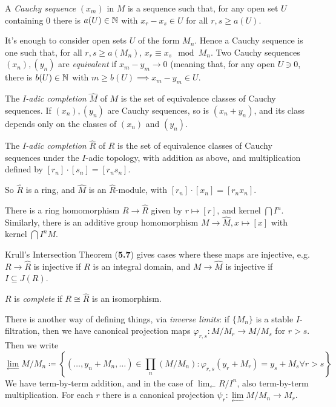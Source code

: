 \documentclass[10pt,a4paper]{article}
\begin{document}
\begin{definition}
  A \emph{Cauchy sequence} $(x_m)$ in $M$ is a sequence such that, for any open set $U$ containing $0$ there is $a(U) \in \mathbb{N}$ with $x_r - x_s \in U$ for all $r, s \geq a(U)$.
\end{definition}
It's enough to consider open sets $U$ of the form $M_n$. Hence a Cauchy sequence is one such that, for all $r, s \geq a(M_n)$, $x_r \equiv x_s \mod M_n$. Two Cauchy sequences $(x_n), (y_n)$ are \emph{equivalent} if $x_m-y_m \to 0$ (meaning that, for any open $U \ni 0$, there is $b(U) \in \mathbb{N}$ with $m \geq b(U) \implies x_m-y_m \in U$.
\begin{definition}
  The \emph{I-adic completion} $\hat{M}$ of $M$ is the set of equivalence classes of Cauchy sequences. If $(x_n), (y_n)$ are Cauchy sequences, so is $(x_n + y_n)$, and its class depends only on the classes of $(x_n)$ and $(y_n)$.

  The \emph{I-adic completion} $\hat{R}$ of $R$ is the set of equivalence classes of Cauchy sequences under the $I$-adic topology, with addition as above, and multiplication defined by $[r_n]\cdot [s_n]
   = [r_ns_n]$.
\end{definition}
So $\hat{R}$ is a ring, and $\hat{M}$ is an $\hat{R}$-module, with $[r_n]\cdot [x_n] = [r_nx_n]$.

There is a ring homomorphism $R \to \hat{R}$ given by $r \mapsto [r]$, and kernel $\bigcap I^n$. Similarly, there is an additive group homomorphism $M \to \hat{M}, x \mapsto [x]$ with kernel $\bigcap I^n M$.

Krull's Intersection Theorem (\textbf{5.7}) gives cases where these maps are injective, e.g. $R \to \hat{R}$ is injective if $R$ is an integral domain, and $M \to \hat{M}$ is injective if $I \subseteq J(R)$.
\begin{definition}
  $R$ is \emph{complete} if $R \cong \hat{R}$ is an isomorphism.
\end{definition}
There is another way of defining things, via \emph{inverse limits}: if $\{M_n\}$ is a stable $I$-filtration, then we have canonical projection maps $\varphi_{r,s}: M/M_r \to M/M_s$ for $r>s$. Then we write
\[\lim_{\leftarrow}M/M_n \coloneqq \left\{(\ldots, y_n + M_n, \ldots) \in \prod_n (M/M_n) : \varphi_{r,s}(y_r+M_r) = y_s +M_s \forall r > s\right\}\]
We have term-by-term addition, and in the case of $\lim_{\leftarrow}{R/I^n}$, also term-by-term multiplication. For each $r$ there is a canonical projection $\psi_r:\lim\limits_\leftarrow M/M_n \to M_r$.
\end{document}

